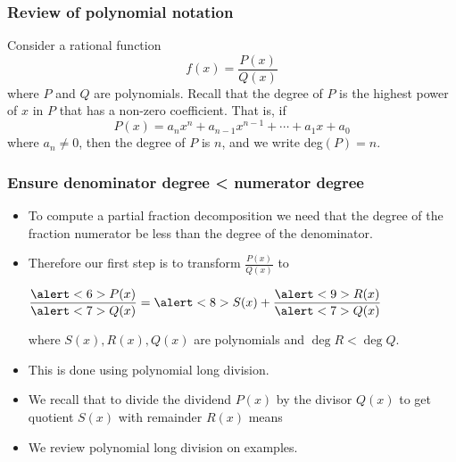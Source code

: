 \begin{frame}
\frametitle{Review of polynomial notation}
Consider a rational function
\[
f(x) = \frac{P(x)}{Q(x)}
\]
where $P$ and $Q$ are polynomials.  Recall that the degree of $P$ is the highest power of $x$ in $P$ that has a non-zero coefficient.  That is, if
\[
P(x) = a_nx^n + a_{n-1}x^{n-1} + \cdots + a_1x + a_0
\]
where $a_n \neq 0$, then the degree of $P$ is $n$, and we write deg$(P) = n$.

\end{frame}
\begin{frame}\frametitle{Ensure denominator degree < numerator degree}
\begin{itemize}
\item To compute a partial fraction decomposition we need that the degree of the fraction numerator be less than the degree of the denominator.
\item<2-> Therefore our first step is to transform $\frac{P(x)}{Q(x)}$ to

$\displaystyle \frac{\alert<6>{P(x)}}{\alert<7>{Q(x)} }= \alert<8>{S(x)}+\frac{\alert<9>{R(x)}}{\alert<7>{Q(x)}} $

where $S(x), R(x), Q(x)$ are polynomials and $\deg R<\deg Q$.
\item<3-> This is done using polynomial long division.
\item<4-> We recall that to divide the \alert<6>{dividend $P(x)$} by the \alert<7>{divisor $Q(x)$} to get \alert<8>{quotient $S(x)$} with \alert<9>{remainder $R(x)$} means 
\item<10-> We review polynomial long division on examples.
\end{itemize}



\end{frame}
